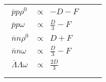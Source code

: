 \documentclass[11pt,a4paper,twoside]{carrollthesis}
\begin{document}
\begin{table}[!b]
\begin{center}
\begin{tabular}{ccc}
\begin{minipage}[c]{0.3\textwidth}
 $  \begin{array}{lrr}
\overline{p}p\rho^0              \  & \propto &   -D-F                   \\[2mm]
\overline{p}p\omega              \  & \propto &   \frac{D}{3}-F          \\[2mm]
\overline{n}n\rho^0              \  & \propto &   D+F                    \\[2mm]
\overline{n}n\omega              \  & \propto &   \frac{D}{3}-F          \\[2mm]
\overline{\Lambda}\Lambda\omega  \  & \propto &   \frac{2D}{3}           \\[2mm]
 \end{array}$
 \end{minipage}
 &
\begin{minipage}[c]{0.3\textwidth}

\end{minipage}
\end{tabular}
\end{center}
\end{table}
\end{document}
